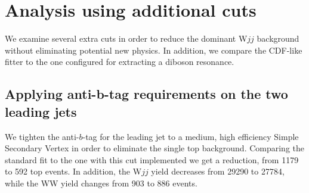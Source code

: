 \section{Analysis using additional cuts}
\label{sec:CutsAndFitterConfigs}
We examine several extra cuts in order to reduce the dominant W$jj$
background without eliminating potential new physics. In addition, we
compare the CDF-like fitter to the one configured for extracting a
diboson resonance.

\subsection{Applying anti-b-tag requirements on the two leading jets}
We tighten the anti-$b$-tag for the leading jet to a medium, high
efficiency Simple Secondary Vertex in order to eliminate the single
top background. Comparing the standard fit to the one with this cut
implemented we get a reduction, from 1179 to 592 top events. In addition,
the W$jj$ yield decreases from 29290 to 27784, while the WW yield
changes from 903 to 886 events.

